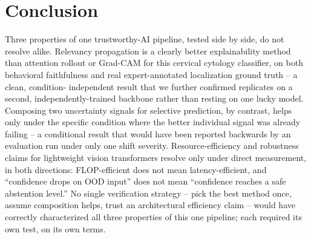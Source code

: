\documentclass[runningheads]{llncs}
\begin{document}
\section{Conclusion}

Three properties of one trustworthy-AI pipeline, tested side by side, do
not resolve alike. Relevancy propagation is a clearly better
explainability method than attention rollout or Grad-CAM for this
cervical cytology classifier, on both behavioral faithfulness and real
expert-annotated localization ground truth -- a clean, condition-
independent result that we further confirmed replicates on a second,
independently-trained backbone rather than resting on one lucky model. Composing two uncertainty signals for selective
prediction, by contrast, helps only under the specific condition where
the better individual signal was already failing -- a conditional result
that would have been reported backwards by an evaluation run under only
one shift severity. Resource-efficiency and robustness claims for
lightweight vision transformers resolve only under direct measurement,
in both directions: FLOP-efficient does not mean latency-efficient, and
``confidence drops on OOD input'' does not mean ``confidence reaches a
safe abstention level.'' No single verification strategy -- pick the best
method once, assume composition helps, trust an architectural efficiency
claim -- would have correctly characterized all three properties of this
one pipeline; each required its own test, on its own terms.
\end{document}
